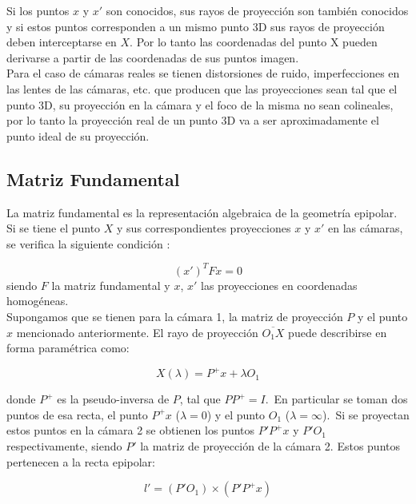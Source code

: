 Si los puntos $x$ y $x'$ son conocidos, sus rayos de proyección son también conocidos y si estos puntos corresponden a un mismo punto 3D sus rayos de proyección deben interceptarse en $X$. Por lo tanto las coordenadas del punto X pueden derivarse a partir de las coordenadas de sus puntos imagen.\\
 
Para el caso de cámaras reales se tienen distorsiones de ruido, imperfecciones en las lentes de las cámaras, etc. que producen que las proyecciones sean tal que el punto 3D, su proyección en la cámara y el foco de la misma no sean colineales, por lo tanto la proyección real de un punto 3D va a ser aproximadamente el punto ideal de su proyección. \\

\subsection{Matriz Fundamental}

La matriz fundamental es la representación algebraica de la geometría epipolar. Si se tiene el punto $X$ y sus correspondientes proyecciones $x$ y $x'$ en las cámaras, se verifica la siguiente condición :

\begin{equation}
(x')^T F x = 0
\label{ec: matriz fundamental}
\end{equation}
siendo  $F$ la matriz fundamental y $x$, $x'$ las proyecciones en coordenadas homogéneas.\\

Supongamos que se tienen para la cámara 1, la matriz de proyección $P$ y el punto $x$ mencionado anteriormente. El rayo de proyección $\overline{O_1X}$  puede describirse en forma paramétrica como:

\begin{equation}
	X(\lambda) = P^+x+\lambda O_1
\end{equation}

donde $P^+$ es la pseudo-inversa de $P$, tal que $PP^+=I$.\
En particular se toman dos puntos de esa recta, el punto $P^+x$ ($\lambda = 0$) y el punto $O_1$ ($\lambda = \infty$).\
Si se proyectan estos puntos en la cámara 2 se obtienen los puntos $P'P^+x$ y $P'O_1$ respectivamente, siendo $P'$ la matriz de proyección de la cámara 2. Estos puntos pertenecen a la recta epipolar:

\begin{equation}
l' = (P'O_1) \times (P'P^+ x)
\end{equation}

